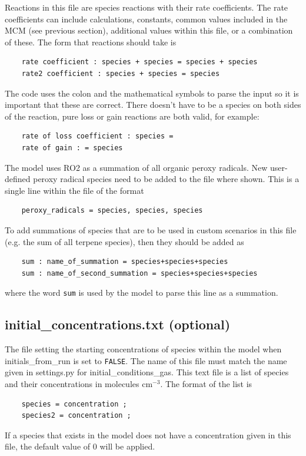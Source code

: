 \documentclass[a4paper]{refart}
\begin{document}
Reactions in this file are species reactions with their rate coefficients. The rate coefficients can include calculations, constants, common values included in the MCM (see previous section), additional values within this file, or a combination of these. The form that reactions should take is
\begin{verbatim}
    rate coefficient : species + species = species + species
    rate2 coefficient : species + species = species
\end{verbatim}
The code uses the colon and the mathematical symbols to parse the input so it is important that these are correct. There doesn't have to be a species on both sides of the reaction, pure loss or gain reactions are both valid, for example:
\begin{verbatim}
    rate of loss coefficient : species =
    rate of gain : = species
\end{verbatim}

The model uses RO2 as a summation of all organic peroxy radicals. New user-defined peroxy radical species need to be added to the file where shown. This is a single line within the file of the format
\begin{verbatim}
    peroxy_radicals = species, species, species
\end{verbatim}

To add summations of species that are to be used in custom scenarios in this file (e.g. the sum of all terpene species), then they should be added as
\begin{verbatim}
    sum : name_of_summation = species+species+species
    sum : name_of_second_summation = species+species+species
\end{verbatim}
where the word \texttt{sum} is used by the model to parse this line as a summation.

\subsection{initial\_concentrations.txt (optional)}\label{initial_concentrations.txt}
The file setting the starting concentrations of species within the model when initials\_from\_run is set to \texttt{FALSE}. The name of this file must match the name given in settings.py for initial\_conditions\_gas. This text file is a list of species and their concentrations in molecules cm$^{-3}$. The format of the list is
\begin{verbatim}
    species = concentration ;
    species2 = concentration ;
\end{verbatim}
If a species that exists in the model does not have a concentration given in this file, the default value of 0 will be applied.
\end{document}
